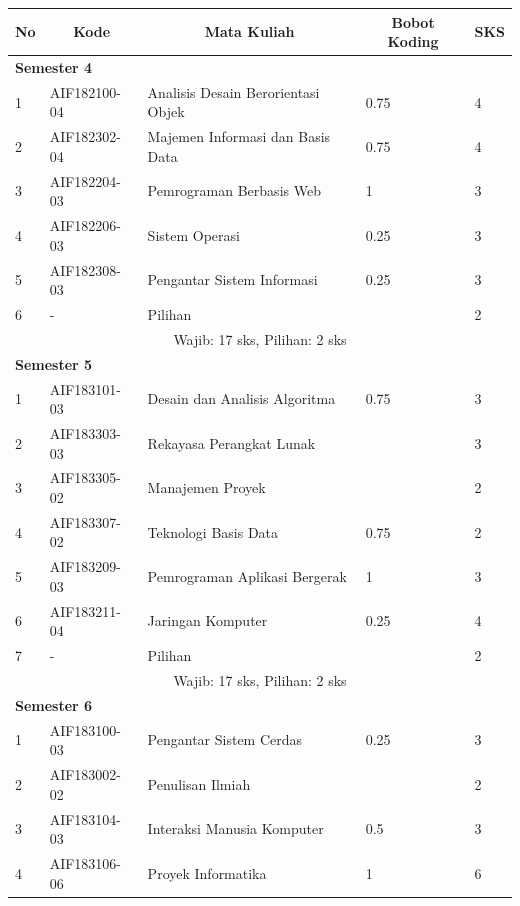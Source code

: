 \begin{table}[H]
	\centering
		\begin{tabular}{|p{0.5cm}|p{2.85cm}|p{4.95cm}|p{2.7cm}|p{2.7cm}|}
			\hline
			\multicolumn{1}{|c|}{\textbf{No}} & \multicolumn{1}{c|}{\textbf{Kode}} & \multicolumn{1}{c|}{\textbf{Mata Kuliah}} & \multicolumn{1}{c|}{\textbf{Bobot Koding}} & \multicolumn{1}{c|}{\textbf{SKS}} \\ \hline
			\multicolumn{5}{|l|}{\textbf{Semester 4}} \\ \hline
			1	& AIF182100-04 &	Analisis Desain Berorientasi Objek &	0.75 &	4  \\ \hline
			2	& AIF182302-04 &	Majemen Informasi dan Basis Data &	0.75 &	4  \\ \hline
			3	& AIF182204-03 &	Pemrograman Berbasis Web &	1 &	3  \\ \hline
			4	& AIF182206-03 &	Sistem Operasi &	0.25 &	3  \\ \hline
			5 &	AIF182308-03 &	Pengantar Sistem Informasi &	0.25 &	3  \\ \hline
			6 &	- &	Pilihan &	&	2  \\ \hline
			\multicolumn{5}{|c|}{Wajib: 17 sks, Pilihan: 2 sks} \\ \hline
			\multicolumn{5}{|l|}{\textbf{Semester 5}} \\ \hline
			1 &	AIF183101-03 &	Desain dan Analisis Algoritma &	0.75 &	3  \\ \hline
			2	& AIF183303-03 &	Rekayasa Perangkat Lunak &  &	3  \\ \hline
			3	& AIF183305-02 &	Manajemen Proyek &  &	2  \\ \hline
			4 &	AIF183307-02 &	Teknologi Basis Data &	0.75 &	2  \\ \hline
			5 &	AIF183209-03 &	Pemrograman Aplikasi Bergerak &	1 &	3 \\ \hline
			6 &	AIF183211-04 &	Jaringan Komputer &	0.25 &	4  \\ \hline
			7 &	- &	Pilihan &	&	2  \\ \hline
			\multicolumn{5}{|c|}{Wajib: 17 sks, Pilihan: 2 sks} \\ \hline
			\multicolumn{5}{|l|}{\textbf{Semester 6}} \\ \hline
			1	& AIF183100-03 &	Pengantar Sistem Cerdas &	0.25 &	3  \\ \hline
			2	& AIF183002-02 &	Penulisan Ilmiah &  &	2  \\ \hline
			3	& AIF183104-03 &	Interaksi Manusia Komputer &	0.5 &	3  \\ \hline
			4	& AIF183106-06 &	Proyek Informatika &	1 &	6 \\ \hline

\end{tabular}
\end{table}
